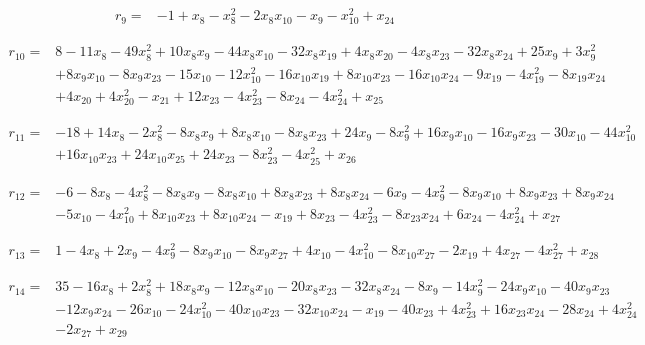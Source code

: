\documentclass[10pt,letterpaper]{article}
\theoremstyle{remark}\newtheorem{remark}[theorem]{Remark}
\begin{document}
\begin{align*}
r_{9}={}&-1+x_{8}-x_{8}^{2}-2x_{8}x_{10}-x_{9}-x_{10}^{2}+x_{24}
\end{align*}

\begin{align*}
r_{10}={}&8-11x_{8}-49x_{8}^{2}+10x_{8}x_{9}-44x_{8}x_{10}-32x_{8}x_{19}+4x_{8}x_{20}-4x_{8}x_{23}-32x_{8}x_{24}+25x_{9}+3x_{9}^{2}\\
&+8x_{9}x_{10}-8x_{9}x_{23}-15x_{10}-12x_{10}^{2}-16x_{10}x_{19}+8x_{10}x_{23}-16x_{10}x_{24}-9x_{19}-4x_{19}^{2}-8x_{19}x_{24}\\
&+4x_{20}+4x_{20}^{2}-x_{21}+12x_{23}-4x_{23}^{2}-8x_{24}-4x_{24}^{2}+x_{25}
\end{align*}

\begin{align*}
r_{11}={}&-18+14x_{8}-2x_{8}^{2}-8x_{8}x_{9}+8x_{8}x_{10}-8x_{8}x_{23}+24x_{9}-8x_{9}^{2}+16x_{9}x_{10}-16x_{9}x_{23}-30x_{10}-44x_{10}^{2}\\
&+16x_{10}x_{23}+24x_{10}x_{25}+24x_{23}-8x_{23}^{2}-4x_{25}^{2}+x_{26}
\end{align*}

\begin{align*}
r_{12}={}&-6-8x_{8}-4x_{8}^{2}-8x_{8}x_{9}-8x_{8}x_{10}+8x_{8}x_{23}+8x_{8}x_{24}-6x_{9}-4x_{9}^{2}-8x_{9}x_{10}+8x_{9}x_{23}+8x_{9}x_{24}\\
&-5x_{10}-4x_{10}^{2}+8x_{10}x_{23}+8x_{10}x_{24}-x_{19}+8x_{23}-4x_{23}^{2}-8x_{23}x_{24}+6x_{24}-4x_{24}^{2}+x_{27}
\end{align*}

\begin{align*}
r_{13}={}&1-4x_{8}+2x_{9}-4x_{9}^{2}-8x_{9}x_{10}-8x_{9}x_{27}+4x_{10}-4x_{10}^{2}-8x_{10}x_{27}-2x_{19}+4x_{27}-4x_{27}^{2}+x_{28}
\end{align*}

\begin{align*}
r_{14}={}&35-16x_{8}+2x_{8}^{2}+18x_{8}x_{9}-12x_{8}x_{10}-20x_{8}x_{23}-32x_{8}x_{24}-8x_{9}-14x_{9}^{2}-24x_{9}x_{10}-40x_{9}x_{23}\\
&-12x_{9}x_{24}-26x_{10}-24x_{10}^{2}-40x_{10}x_{23}-32x_{10}x_{24}-x_{19}-40x_{23}+4x_{23}^{2}+16x_{23}x_{24}-28x_{24}+4x_{24}^{2}\\
&-2x_{27}+x_{29}
\end{align*}
\end{document}
